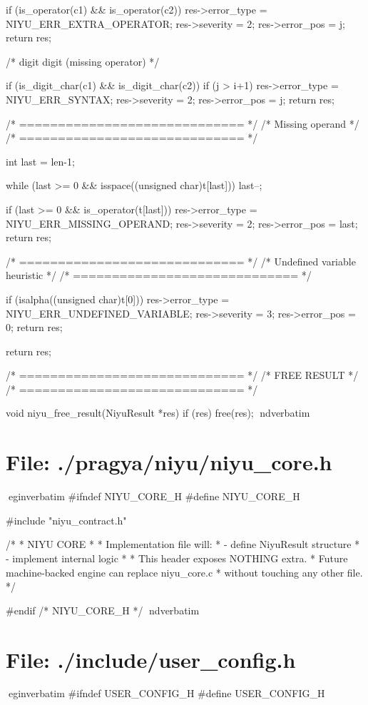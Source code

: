 \documentclass{article}
\begin{document}
{{        if (is_operator(c1) && is_operator(c2))
        {
            res->error_type = NIYU_ERR_EXTRA_OPERATOR;
            res->severity = 2;
            res->error_pos = j;
            return res;
        }

        /* digit digit (missing operator) */

        if (is_digit_char(c1) && is_digit_char(c2))
        {
            if (j > i+1)
            {
                res->error_type = NIYU_ERR_SYNTAX;
                res->severity = 2;
                res->error_pos = j;
                return res;
            }
        }
    }

    /* ============================= */
    /* Missing operand               */
    /* ============================= */

    int last = len-1;

    while (last >= 0 && isspace((unsigned char)t[last]))
        last--;

    if (last >= 0 && is_operator(t[last]))
    {
        res->error_type = NIYU_ERR_MISSING_OPERAND;
        res->severity = 2;
        res->error_pos = last;
        return res;
    }

    /* ============================= */
    /* Undefined variable heuristic  */
    /* ============================= */

    if (isalpha((unsigned char)t[0]))
    {
        res->error_type = NIYU_ERR_UNDEFINED_VARIABLE;
        res->severity = 3;
        res->error_pos = 0;
        return res;
    }

    return res;
}


/* ============================= */
/* FREE RESULT                   */
/* ============================= */

void niyu_free_result(NiyuResult *res)
{
    if (res)
        free(res);
}
nd{verbatim}
\section*{File: ./pragya/niyu/niyu_core.h}
egin{verbatim}
#ifndef NIYU_CORE_H
#define NIYU_CORE_H

#include "niyu_contract.h"

/*
 * NIYU CORE
 *
 * Implementation file will:
 * - define NiyuResult structure
 * - implement internal logic
 *
 * This header exposes NOTHING extra.
 * Future machine-backed engine can replace niyu_core.c
 * without touching any other file.
 */

#endif /* NIYU_CORE_H */
nd{verbatim}
\section*{File: ./include/user_config.h}
egin{verbatim}
#ifndef USER_CONFIG_H
#define USER_CONFIG_H
\end{document}
